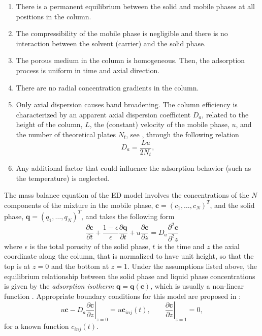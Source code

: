 \documentclass[preprint]{elsarticle}
\theoremstyle{definition}
\newcommand{\bc}{\boldsymbol c}
\newcommand{\bq}{\boldsymbol q}
\begin{document}
\begin{enumerate}
\item There is a permanent equilibrium between the solid and mobile
  phases at all positions in the column. 
\item The compressibility of the mobile phase is negligible and there is no interaction
  between the solvent (carrier) and the solid phase.
\item The porous medium in the column is homogeneous. Then, the
  adsorption process is uniform in time and axial direction. 
\item There are no radial concentration gradients in the column. 
\item Only axial dispersion causes band broadening. The column
  efficiency is characterized by an apparent axial dispersion
  coefficient $D_a$, related to the height of the column, $L$, the
  (constant) velocity of the mobile phase, $u$, and the number of
  theoretical plates $N_t$, see \cite{Guiochon}, through the following
  relation    
\begin{equation*}D_a=\frac{Lu}{2N_t},
\end{equation*}


\item   Any additional factor that could influence the adsorption
  behavior (such as the temperature) is neglected. \end{enumerate}


The  mass balance equation of the ED model involves the
concentrations of the $N$  components of
the mixture in the mobile phase, ${\boldsymbol c}=(c_1,\ldots,c_N)^T$,
and the solid phase,
${\boldsymbol q}=(q_1,\ldots,q_N)^T$, and takes the following form
\begin{equation}\label{eq:modelED}
\frac{\partial {\boldsymbol c}}{\partial t}+\frac{1-\epsilon}{\epsilon}\frac{\partial {\boldsymbol q}}{\partial t}+u\frac{\partial {\boldsymbol c}}{\partial z}=D_a \frac{\partial^2 {\boldsymbol c}}{\partial^2 z}
\end{equation}
where $\epsilon$ is the total porosity of the solid phase,  $t$ is the time and
$z$ the axial coordinate along the column, that is normalized to have
unit height, so that the top is at $z=0$ and the bottom at $z=1$.
 Under the assumptions listed above, the equilibrium relationship
  between the solid 
phase and liquid phase concentrations is given by the {\em adsorption
isotherm} $\bq=\bq(\bc)$, which  is usually a non-linear function
\cite{Guiochon}. Appropriate boundary conditions for this model are proposed
in \cite{Guiochon}: 
\begin{equation}\label{eq:bc2}
  \left. u{\boldsymbol c}-D_a \frac{\partial {\boldsymbol c}}{\partial z} \right|_{z=0} = u{\boldsymbol c}_{inj}(t), \qquad \left. \frac{\partial {\boldsymbol c}}{\partial z}\right|_{z=1}=0,
\end{equation}
for a known function $c_{inj}(t)$.
\end{document}
